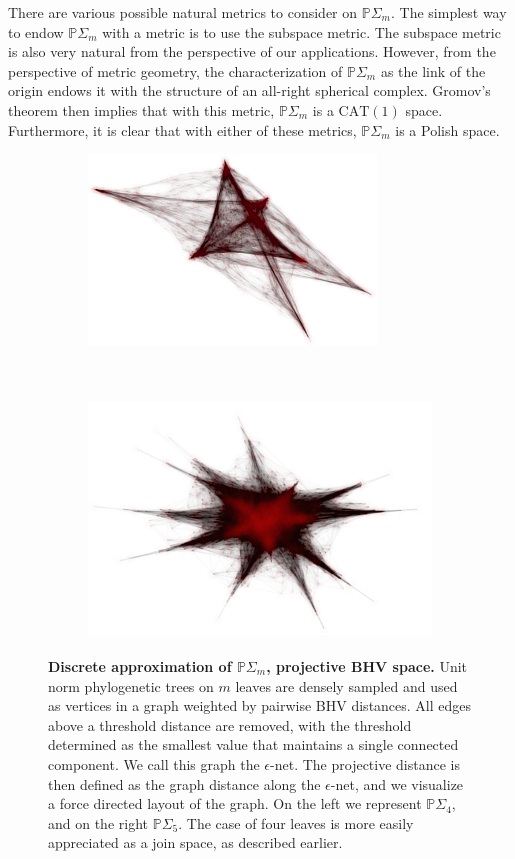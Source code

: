 \documentclass[a4paper,11pt]{article}
\newcommand{\CAT}{\textrm{CAT}}
\begin{document}
There are various possible natural metrics to consider on $\mathbb{P} \Sigma_m$.
The simplest way to endow $\mathbb{P} \Sigma_m$ with a metric is to use the subspace metric.
The subspace metric is also very natural from the perspective of our applications.
However, from the perspective of metric geometry, the characterization of $\mathbb{P} \Sigma_m$ as the link of the origin endows it with the structure of an all-right spherical complex.
Gromov's theorem then implies that with this metric, $\mathbb{P} \Sigma_m$ is a $\CAT(1)$ space.
Furthermore, it is clear that with either of these metrics, $\mathbb{P} \Sigma_m$ is a Polish space.

\begin{figure}
    \begin{subfigure}{0.5\linewidth}
    \centering
    \includegraphics[height=2in]{../figures/epsilon_net_quad.png}
    \end{subfigure}
    ~
    \begin{subfigure}{0.5\linewidth}
    \centering
    \includegraphics[height=2.5in]{../figures/epsilon_net_quint.png}
    \end{subfigure}

    \caption{{\bf Discrete approximation of $\mathbb{P}\Sigma_m$, projective BHV space.} Unit norm phylogenetic trees on $m$ leaves are densely sampled and used as vertices in a graph weighted by pairwise BHV distances. All edges above a threshold distance are removed, with the threshold determined as the smallest value that maintains a single connected component. We call this graph the  $\epsilon$-net. The projective distance is then defined as the graph distance along the $\epsilon$-net, and we visualize a force directed layout of the graph. On the left we represent $\mathbb{P}\Sigma_4$, and on the right $\mathbb{P}\Sigma_5$. The case of four leaves is more easily appreciated as a join space, as described earlier.}
     \label{fig:epsilon_net}
\end{figure}
\end{document}
